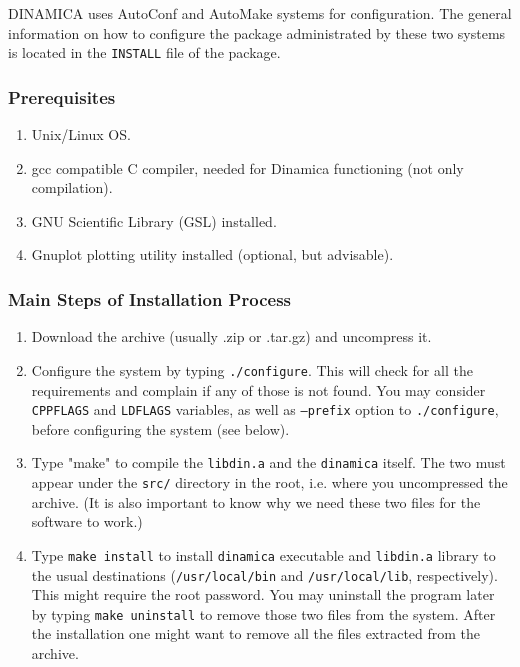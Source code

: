 \documentclass[11pt,a4paper]{article}
\begin{document}
DINAMICA uses AutoConf and AutoMake systems for configuration. The general
information on how to configure the package administrated by these two systems is
located in the \texttt{INSTALL} file of the package.

\subsubsection{Prerequisites}
\label{sec:prerequisites}

\begin{enumerate}
\item Unix/Linux OS.
\item gcc compatible C compiler, needed for Dinamica functioning (not only
  compilation).
\item GNU Scientific Library (GSL) installed.
\item Gnuplot plotting utility installed (optional, but advisable).
\end{enumerate}

\subsubsection{Main Steps of Installation Process}
\label{sec:quick-installation}

\begin{enumerate}
\item Download the archive (usually .zip or .tar.gz) and uncompress it.
\item Configure the system by typing \texttt{./configure}. This will check for all
  the requirements and complain if any of those is not found. You may consider
  \texttt{CPPFLAGS} and \texttt{LDFLAGS} variables, as well as \texttt{--prefix}
  option to \texttt{./configure}, before configuring the system (see below).
\item Type "make" to compile the \texttt{libdin.a} and the \texttt{dinamica}
  itself. The two must appear under the \texttt{src/} directory in the root,
  i.e. where you uncompressed the archive. (It is also important to know why we need
  these two files for the software to work.)
\item Type \texttt{make install} to install \texttt{dinamica} executable and
  \texttt{libdin.a} library to the usual destinations (\texttt{/usr/local/bin} and
  \texttt{/usr/local/lib}, respectively). This might require the root password. You
  may uninstall the program later by typing \texttt{make uninstall} to remove those
  two files from the system. After the installation one might want to remove all the
  files extracted from the archive.
\end{enumerate}
\end{document}
